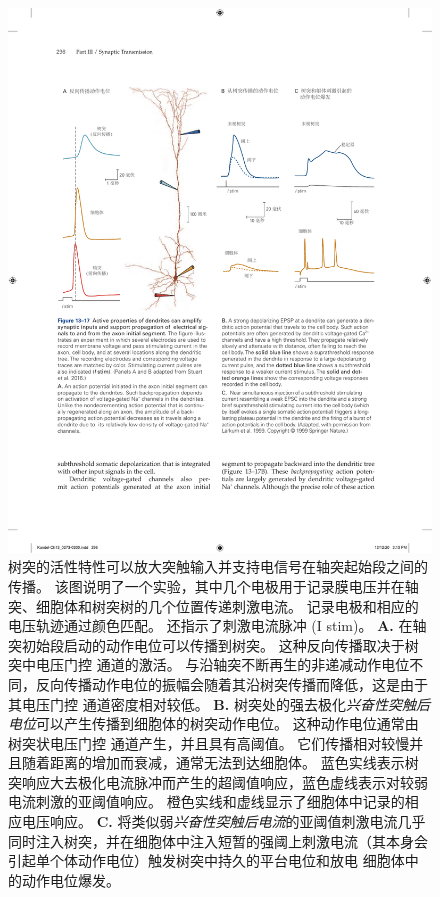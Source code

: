 \begin{figure}[htbp]
	\centering
	\includegraphics[width=1.0\linewidth]{chap13/fig_13_17}
	\caption{树突的活性特性可以放大突触输入并支持电信号在轴突起始段之间的传播。
		该图说明了一个实验，其中几个电极用于记录膜电压并在轴突、细胞体和树突树的几个位置传递刺激电流。
		记录电极和相应的电压轨迹通过颜色匹配。
		还指示了刺激电流脉冲 (I stim)\cite{stuart2016dendrites}。
		\textbf{A.} 在轴突初始段启动的动作电位可以传播到树突。
		这种反向传播取决于树突中电压门控  通道的激活。
		与沿轴突不断再生的非递减动作电位不同，反向传播动作电位的振幅会随着其沿树突传播而降低，这是由于其电压门控  通道密度相对较低。
		\textbf{B.} 树突处的强去极化\textit{兴奋性突触后电位}可以产生传播到细胞体的树突动作电位。
		这种动作电位通常由树突状电压门控  通道产生，并且具有高阈值。
		它们传播相对较慢并且随着距离的增加而衰减，通常无法到达细胞体。
		蓝色实线表示树突响应大去极化电流脉冲而产生的超阈值响应，蓝色虚线表示对较弱电流刺激的亚阈值响应。
		橙色实线和虚线显示了细胞体中记录的相应电压响应。
		\textbf{C.} 将类似弱\textit{兴奋性突触后电流}的亚阈值刺激电流几乎同时注入树突，并在细胞体中注入短暂的强阈上刺激电流（其本身会引起单个体动作电位）触发树突中持久的平台电位和放电 细胞体中的动作电位爆发\cite{larkum1999new}。}
	\label{fig:13_17}
\end{figure}


